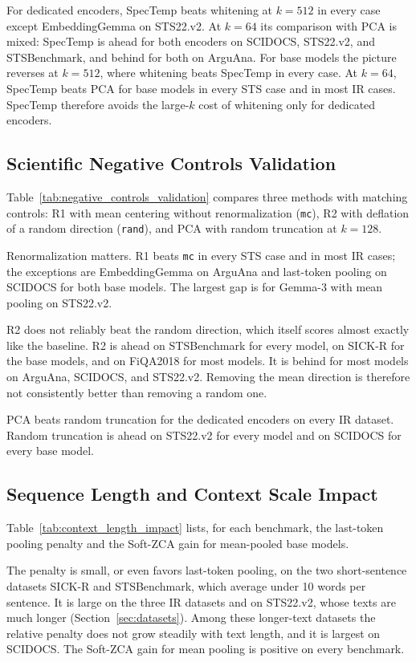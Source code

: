 For dedicated encoders, SpecTemp beats whitening at $k=512$ in every case except EmbeddingGemma on STS22.v2. At $k=64$ its comparison with PCA is mixed: SpecTemp is ahead for both encoders on SCIDOCS, STS22.v2, and STSBenchmark, and behind for both on ArguAna. For base models the picture reverses at $k=512$, where whitening beats SpecTemp in every case. At $k=64$, SpecTemp beats PCA for base models in every STS case and in most IR cases. SpecTemp therefore avoids the large-$k$ cost of whitening only for dedicated encoders.

\subsection{Scientific Negative Controls Validation}
Table~\ref{tab:negative_controls_validation} compares three methods with matching controls: R1 with mean centering without renormalization (\texttt{mc}), R2 with deflation of a random direction (\texttt{rand}), and PCA with random truncation at $k=128$.

Renormalization matters. R1 beats \texttt{mc} in every STS case and in most IR cases; the exceptions are EmbeddingGemma on ArguAna and last-token pooling on SCIDOCS for both base models. The largest gap is for Gemma-3 with mean pooling on STS22.v2.

R2 does not reliably beat the random direction, which itself scores almost exactly like the baseline. R2 is ahead on STSBenchmark for every model, on SICK-R for the base models, and on FiQA2018 for most models. It is behind for most models on ArguAna, SCIDOCS, and STS22.v2. Removing the mean direction is therefore not consistently better than removing a random one.

PCA beats random truncation for the dedicated encoders on every IR dataset. Random truncation is ahead on STS22.v2 for every model and on SCIDOCS for every base model.

\subsection{Sequence Length and Context Scale Impact}
Table~\ref{tab:context_length_impact} lists, for each benchmark, the last-token pooling penalty and the Soft-ZCA gain for mean-pooled base models.

The penalty is small, or even favors last-token pooling, on the two short-sentence datasets SICK-R and STSBenchmark, which average under 10 words per sentence. It is large on the three IR datasets and on STS22.v2, whose texts are much longer (Section~\ref{sec:datasets}). Among these longer-text datasets the relative penalty does not grow steadily with text length, and it is largest on SCIDOCS. The Soft-ZCA gain for mean pooling is positive on every benchmark.


